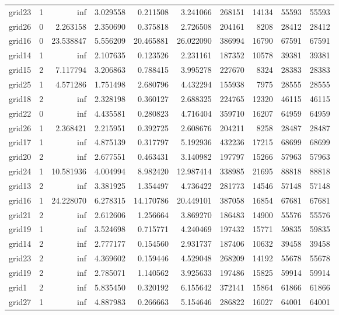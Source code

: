 \begin{longtable}{|l|r|r|r|r|r|r|r|r|r|}
grid23 & 1 & inf & 3.029558 & 0.211508 & 3.241066 & 268151 & 14134 & 55593 & 55593 \\
grid26 & 0 & 2.263158 & 2.350690 & 0.375818 & 2.726508 & 204161 & 8208 & 28412 & 28412 \\
grid16 & 0 & 23.538847 & 5.556209 & 20.465881 & 26.022090 & 386994 & 16790 & 67591 & 67591 \\
grid14 & 1 & inf & 2.107635 & 0.123526 & 2.231161 & 187352 & 10578 & 39381 & 39381 \\
grid15 & 2 & 7.117794 & 3.206863 & 0.788415 & 3.995278 & 227670 & 8324 & 28383 & 28383 \\
grid25 & 1 & 4.571286 & 1.751498 & 2.680796 & 4.432294 & 155938 & 7975 & 28555 & 28555 \\
grid18 & 2 & inf & 2.328198 & 0.360127 & 2.688325 & 224765 & 12320 & 46115 & 46115 \\
grid22 & 0 & inf & 4.435581 & 0.280823 & 4.716404 & 359710 & 16207 & 64959 & 64959 \\
grid26 & 1 & 2.368421 & 2.215951 & 0.392725 & 2.608676 & 204211 & 8258 & 28487 & 28487 \\
grid17 & 1 & inf & 4.875139 & 0.317797 & 5.192936 & 432236 & 17215 & 68699 & 68699 \\
grid20 & 2 & inf & 2.677551 & 0.463431 & 3.140982 & 197797 & 15266 & 57963 & 57963 \\
grid24 & 1 & 10.581936 & 4.004994 & 8.982420 & 12.987414 & 338985 & 21695 & 88818 & 88818 \\
grid13 & 2 & inf & 3.381925 & 1.354497 & 4.736422 & 281773 & 14546 & 57148 & 57148 \\
grid16 & 1 & 24.228070 & 6.278315 & 14.170786 & 20.449101 & 387058 & 16854 & 67681 & 67681 \\
grid21 & 2 & inf & 2.612606 & 1.256664 & 3.869270 & 186483 & 14900 & 55576 & 55576 \\
grid19 & 1 & inf & 3.524698 & 0.715771 & 4.240469 & 197432 & 15771 & 59835 & 59835 \\
grid14 & 2 & inf & 2.777177 & 0.154560 & 2.931737 & 187406 & 10632 & 39458 & 39458 \\
grid23 & 2 & inf & 4.369602 & 0.159446 & 4.529048 & 268209 & 14192 & 55678 & 55678 \\
grid19 & 2 & inf & 2.785071 & 1.140562 & 3.925633 & 197486 & 15825 & 59914 & 59914 \\
grid1 & 2 & inf & 5.835450 & 0.320192 & 6.155642 & 372141 & 15864 & 61866 & 61866 \\
grid27 & 1 & inf & 4.887983 & 0.266663 & 5.154646 & 286822 & 16027 & 64001 & 64001 \\

\end{longtable}
